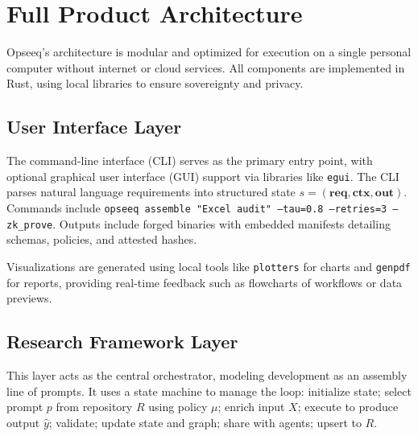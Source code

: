 \documentclass{article}
\theoremstyle{definition}
\newcommand{\req}{\mathbf{req}}
\newcommand{\ctx}{\mathbf{ctx}}
\newcommand{\out}{\mathbf{out}}
\newcommand{\yp}{\hat{y}}
\begin{document}
\section{Full Product Architecture}

Opseeq's architecture is modular and optimized for execution on a single personal computer without internet or cloud services. All components are implemented in Rust, using local libraries to ensure sovereignty and privacy.

\subsection{User Interface Layer}
The command-line interface (CLI) serves as the primary entry point, with optional graphical user interface (GUI) support via libraries like \texttt{egui}. The CLI parses natural language requirements into structured state $s = (\req, \ctx, \out)$. Commands include \texttt{opseeq assemble "Excel audit" --tau=0.8 --retries=3 --zk\_prove}. Outputs include forged binaries with embedded manifests detailing schemas, policies, and attested hashes.

Visualizations are generated using local tools like \texttt{plotters} for charts and \texttt{genpdf} for reports, providing real-time feedback such as flowcharts of workflows or data previews.

\subsection{Research Framework Layer}
This layer acts as the central orchestrator, modeling development as an assembly line of prompts. It uses a state machine to manage the loop: initialize state; select prompt $p$ from repository $R$ using policy $\mu$; enrich input $X$; execute to produce output $\yp$; validate; update state and graph; share with agents; upsert to $R$.
\end{document}
